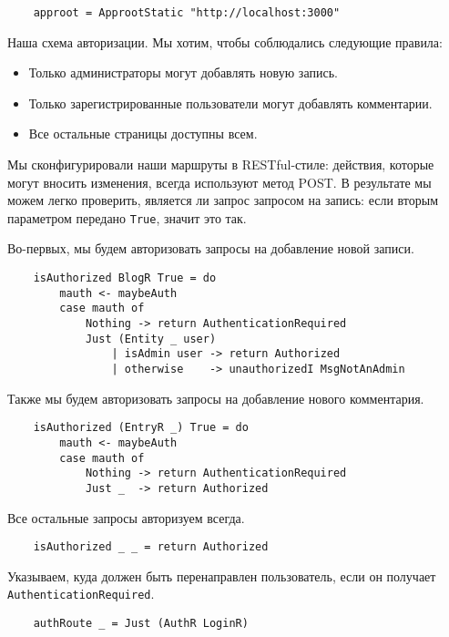 \begin{lstlisting}
    approot = ApprootStatic "http://localhost:3000"
\end{lstlisting}

Наша схема авторизации. Мы хотим, чтобы соблюдались следующие правила:

\begin{itemize}
\item Только администраторы могут добавлять новую запись.
\item Только зарегистрированные пользователи могут добавлять комментарии.
\item Все остальные страницы доступны всем.
\end{itemize}

Мы сконфигурировали наши маршруты в RESTful-стиле: действия, которые могут вносить изменения, всегда используют метод POST. В результате мы можем легко проверить, является ли запрос запросом на запись: если вторым параметром передано \lstinline!True!, значит это так.

Во-первых, мы будем авторизовать запросы на добавление новой записи.

\begin{lstlisting}
    isAuthorized BlogR True = do
        mauth <- maybeAuth
        case mauth of
            Nothing -> return AuthenticationRequired
            Just (Entity _ user)
                | isAdmin user -> return Authorized
                | otherwise    -> unauthorizedI MsgNotAnAdmin
\end{lstlisting}

Также мы будем авторизовать запросы на добавление нового комментария.

\begin{lstlisting}
    isAuthorized (EntryR _) True = do
        mauth <- maybeAuth
        case mauth of
            Nothing -> return AuthenticationRequired
            Just _  -> return Authorized
\end{lstlisting}

Все остальные запросы авторизуем всегда.

\begin{lstlisting}
    isAuthorized _ _ = return Authorized
\end{lstlisting}

Указываем, куда должен быть перенаправлен пользователь, если он получает \lstinline!AuthenticationRequired!.

\begin{lstlisting}
    authRoute _ = Just (AuthR LoginR)
\end{lstlisting}

